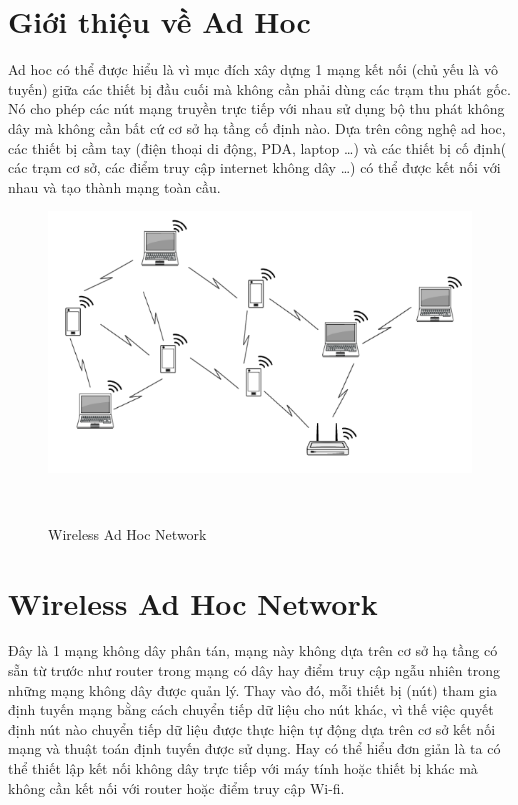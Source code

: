 \documentclass[12pt,a4paper]{report}
\begin{document}
\section{Giới thiệu về Ad Hoc}
\hspace{25pt} Ad hoc có thể được hiểu là vì mục đích xây dựng 1 mạng kết nối (chủ yếu là vô tuyến) giữa các thiết bị đầu cuối mà không cần phải dùng các trạm thu phát gốc. Nó cho phép các nút mạng truyền trực tiếp với nhau sử dụng bộ thu phát không dây mà không cần bất cứ cơ sở hạ tầng cố định nào. Dựa trên công nghệ ad hoc, các thiết bị cầm tay (điện thoại di động, PDA, laptop …) và các thiết bị cố định( các trạm cơ sở, các điểm truy cập internet không dây …) có thể được kết nối với nhau và tạo thành mạng toàn cầu.
\begin{figure}
	\begin{center}
		\includegraphics[scale=0.6]{ad_hoc.png}	
	\end{center}
	\caption{Wireless Ad Hoc Network}
	\label{refhinh1.1}\
\end{figure}

\section{Wireless Ad Hoc Network}
\hspace{25pt} Đây là 1 mạng không dây phân tán, mạng này không dựa trên cơ sở hạ tầng có sẵn từ trước như router trong mạng có dây hay điểm truy cập ngẫu nhiên trong những mạng không dây được quản lý. Thay vào đó, mỗi thiết bị (nút) tham gia định tuyến mạng bằng cách chuyển tiếp dữ liệu cho nút khác, vì thế việc quyết định nút nào chuyển tiếp dữ liệu được thực hiện tự động dựa trên cơ sở kết nối mạng và thuật toán định tuyến được sử dụng. Hay có thể hiểu đơn giản là ta có thể thiết lập kết nối không dây trực tiếp với máy tính hoặc thiết bị khác mà không cần kết nối với router hoặc điểm truy cập Wi-fi.
\end{document}
